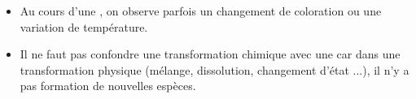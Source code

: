 \begin{myrems}
	\begin{itemize}
		\item Au cours d'une , on observe parfois un changement de coloration ou une variation de température.
		\item Il ne faut pas confondre une transformation chimique avec une  car dans une transformation physique (mélange, dissolution, changement d'état ...), il n'y a pas formation de nouvelles espèces.
	\end{itemize}
\end{myrems}